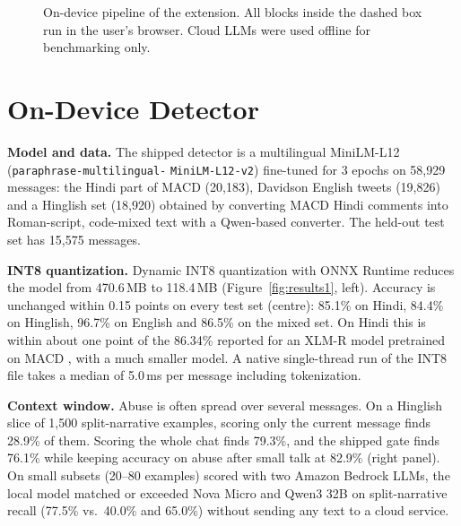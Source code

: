 \documentclass[sigconf,9pt]{acmart}
\begin{document}
\begin{figure}[!t]
  \centering
  \resizebox{\textwidth}{!}{}
  \caption{On-device pipeline of the extension. All blocks inside the dashed box run in the user's browser. Cloud LLMs were used offline for benchmarking only.}
  \label{fig:system}
\end{figure}

\section{On-Device Detector}\label{sec:ondevice}

\par\textbf{Model and data.} The shipped detector is a multilingual MiniLM-L12 (\texttt{paraphrase-multilingual-} \texttt{MiniLM-L12-v2}) \cite{reimers2020multilingual,wang2020minilm} fine-tuned for 3 epochs on 58{,}929 messages: the Hindi part of MACD \cite{NEURIPS2022_a7c4163b} (20{,}183), Davidson English tweets \cite{davidson2017automated} (19{,}826) and a Hinglish set (18{,}920) obtained by converting MACD Hindi comments into Roman-script, code-mixed text with a Qwen-based converter. The held-out test set has 15{,}575 messages.

\par\textbf{INT8 quantization.} Dynamic INT8 quantization with ONNX Runtime \cite{jacob2018quantization} reduces the model from 470.6\,MB to 118.4\,MB (Figure~\ref{fig:results1}, left). Accuracy is unchanged within 0.15 points on every test set (centre): 85.1\% on Hindi, 84.4\% on Hinglish, 96.7\% on English and 86.5\% on the mixed set. On Hindi this is within about one point of the 86.34\% reported for an XLM-R model pretrained on MACD \cite{NEURIPS2022_a7c4163b}, with a much smaller model. A native single-thread run of the INT8 file takes a median of 5.0\,ms per message including tokenization.

\par\textbf{Context window.} Abuse is often spread over several messages. On a Hinglish slice of 1{,}500 split-narrative examples, scoring only the current message finds 28.9\% of them. Scoring the whole chat finds 79.3\%, and the shipped gate finds 76.1\% while keeping accuracy on abuse after small talk at 82.9\% (right panel). On small subsets (20--80 examples) scored with two Amazon Bedrock LLMs, the local model matched or exceeded Nova Micro and Qwen3 32B on split-narrative recall (77.5\% vs.\ 40.0\% and 65.0\%) without sending any text to a cloud service.
\end{document}

